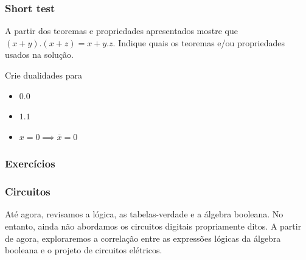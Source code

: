 \begin{frame}
	\frametitle{Short test}
	\par A partir dos teoremas e propriedades apresentados mostre que $(x+y).(x+z)=x+y.z$. Indique quais os teoremas e/ou propriedades usados na solução.\newline
	\par Crie dualidades para
	\begin{itemize}
		\item $0.0$
		\item $1.1$
		\item $x=0 \implies \overline{x}=0$
	\end{itemize}
	
	
\end{frame}


\begin{frame}
	\frametitle{Exercícios}
\end{frame}

\begin{frame}
	\frametitle{Circuitos}
	\par Até agora, revisamos a lógica, as tabelas-verdade e a álgebra booleana. No entanto, ainda não abordamos os circuitos digitais propriamente ditos. A partir de agora, exploraremos a correlação entre as expressões lógicas da álgebra booleana e o projeto de circuitos elétricos.
\end{frame}

